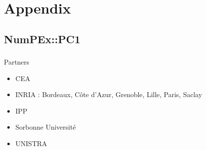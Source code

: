 \appendix
\section{Appendix}
\subsection{NumPEx::PC1}

\begin{frame}
  \frametitle{\insertsectionhead}
  \framesubtitle{\insertsubsectionhead}

  Partners
  \begin{itemize}
    \item CEA 
    \item INRIA : Bordeaux,  Côte d'Azur, Grenoble, Lille, Paris, Saclay
    \item IPP 
    \item Sorbonne Université 
    \item UNISTRA  
  \end{itemize}
\end{frame}


